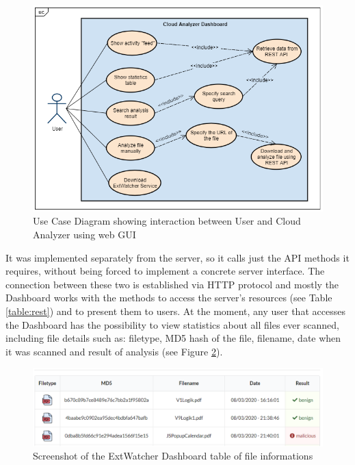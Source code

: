 \begin{figure}[H]
	\centerline{\includegraphics[scale=0.7]{figures/usecaseGUI.png}}  
	\caption{Use Case Diagram showing interaction between User and Cloud Analyzer using web GUI}
	\label{usecase}
\end{figure}

It was implemented separately from the server, so it calls just the API methods it requires, without being forced to implement a concrete server interface. The connection between these two is established via HTTP protocol and mostly the Dashboard works with the  methods to access the server's resources (see Table \ref{table:rest}) and to present them to users. At the moment, any user that accesses the Dashboard has the possibility to view statistics about all files ever scanned, including file details such as: filetype, MD5 hash of the file, filename, date when it was scanned and result of analysis (see Figure \ref{screenshot:infotable}). 

\begin{figure}[H]
	\centerline{\includegraphics[scale=0.6]{figures/infotable.png}}  
	\caption{Screenshot of the ExtWatcher Dashboard table of file informations}
	\label{screenshot:infotable}
\end{figure}

